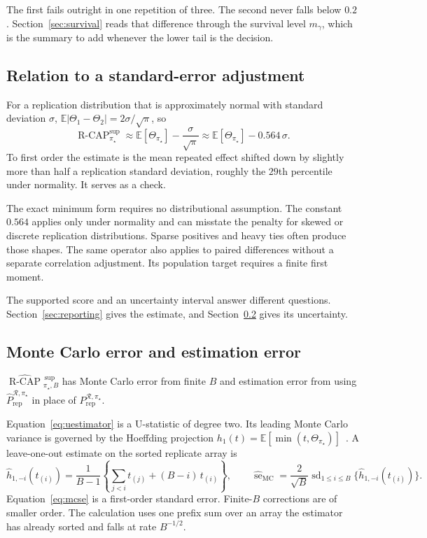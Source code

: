 \documentclass[11pt]{article}
\newcommand{\Regime}{\mathcal{R}}
\newcommand{\E}{\mathbb{E}}
\newcommand{\RCAP}{\operatorname{R\text{-}CAP}^{\mathrm{sup}}_{\pi_\star}}
\newcommand{\RCAPHatB}{\widehat{\operatorname{R\text{-}CAP}}{}^{\,\mathrm{sup}}_{\pi_\star,B}}
\newcommand{\PRep}{P_{\mathrm{rep}}^{\Regime,\pi_\star}}
\newcommand{\PRepHat}{\widehat{P}_{\mathrm{rep}}^{\Regime,\pi_\star}}
\theoremstyle{remark}
\begin{document}
The first fails outright in one repetition of three. The second never falls below $0.2$. Section~\ref{sec:survival} reads that difference through the survival level $m_\gamma$, which is the summary to add whenever the lower tail is the decision.

\subsection{Relation to a standard-error adjustment}

For a replication distribution that is approximately normal with standard deviation $\sigma$, $\E|\Theta_1-\Theta_2|=2\sigma/\sqrt{\pi}$, so
\begin{equation}
\RCAP
\approx
\E[\Theta_{\pi_\star}]-\frac{\sigma}{\sqrt{\pi}}
\approx
\E[\Theta_{\pi_\star}]-0.564\,\sigma .
\label{eq:se-approximation}
\end{equation}
To first order the estimate is the mean repeated effect shifted down by slightly more than half a replication standard deviation, roughly the $29$th percentile under normality. It serves as a check.

The exact minimum form requires no distributional assumption. The constant $0.564$ applies only under normality and can misstate the penalty for skewed or discrete replication distributions. Sparse positives and heavy ties often produce those shapes. The same operator also applies to paired differences without a separate correlation adjustment. Its population target requires a finite first moment.

The supported score and an uncertainty interval answer different questions. Section~\ref{sec:reporting} gives the estimate, and Section~\ref{sec:error} gives its uncertainty.

\subsection{Monte Carlo error and estimation error}
\label{sec:error}

$\RCAPHatB$ has Monte Carlo error from finite $B$ and estimation error from using $\PRepHat$ in place of $\PRep$.

Equation~\eqref{eq:uestimator} is a U-statistic of degree two. Its leading Monte Carlo variance is governed by the Hoeffding projection $h_1(t)=\E[\min(t,\Theta_{\pi_\star})]$~\cite{hoeffding1948ustat}. A leave-one-out estimate on the sorted replicate array is
\begin{equation}
\widehat h_{1,-i}(t_{(i)})
=
\frac{1}{B-1}
\left\{
\sum_{j<i}t_{(j)}
+
(B-i)\,t_{(i)}
\right\},
\qquad
\widehat{\operatorname{se}}_{\mathrm{MC}}
=
\frac{2}{\sqrt{B}}
\operatorname{sd}_{1\leq i\leq B}
\{\widehat h_{1,-i}(t_{(i)})\}.
\label{eq:mcse}
\end{equation}
Equation~\eqref{eq:mcse} is a first-order standard error. Finite-$B$ corrections are of smaller order. The calculation uses one prefix sum over an array the estimator has already sorted and falls at rate $B^{-1/2}$.
\end{document}
